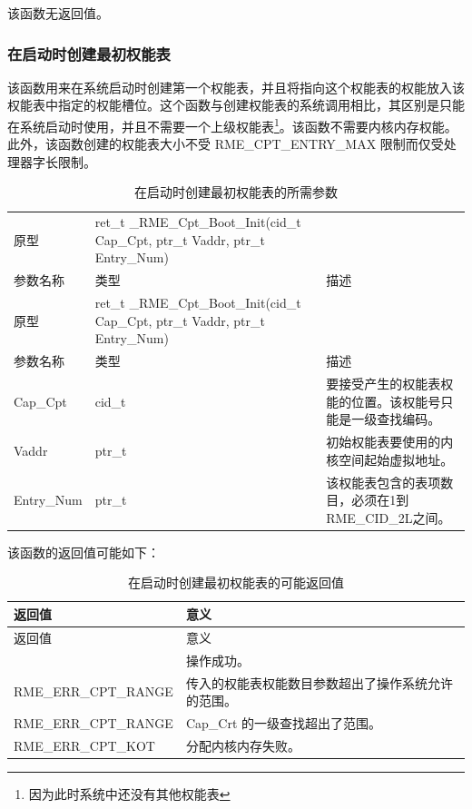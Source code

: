 该函数无返回值。

\subsubsection{在启动时创建最初权能表}\label{subsubsec:7-create-initial-capability-table-at-boot}

该函数用来在系统启动时创建第一个权能表，并且将指向这个权能表的权能放入该权能表中指定的权能槽位。这个函数与创建权能表的系统调用相比，其区别是只能在系统启动时使用，并且不需要一个上级权能表\footnote{因为此时系统中还没有其他权能表}。该函数不需要内核内存权能。此外，该函数创建的权能表大小不受 RME\_CPT\_ENTRY\_MAX 限制而仅受处理器字长限制。

\begin{xltabular}{\textwidth}{@{}>{\hsize\raggedright\arraybackslash}X>{\hsize\raggedright\arraybackslash}X>{\hsize\raggedright\arraybackslash}X@{}}
\caption{在启动时创建最初权能表的所需参数}\label{tab:7-41-create-initial-capability-table-at-boot-parameters}\\
\toprule
原型 & ret\_t \_RME\_Cpt\_Boot\_Init(cid\_t Cap\_Cpt, ptr\_t Vaddr,
ptr\_t Entry\_Num) &\tabularnewline
参数名称 & 类型 & 描述\tabularnewline
\endfirsthead
\toprule
原型 & ret\_t \_RME\_Cpt\_Boot\_Init(cid\_t Cap\_Cpt, ptr\_t Vaddr,
ptr\_t Entry\_Num) &\tabularnewline
参数名称 & 类型 & 描述\tabularnewline
\midrule
\endhead
\bottomrule
\endlastfoot
Cap\_Cpt & cid\_t &
要接受产生的权能表权能的位置。该权能号只能是一级查找编码。\tabularnewline
Vaddr & ptr\_t & 初始权能表要使用的内核空间起始虚拟地址。\tabularnewline
Entry\_Num & ptr\_t &
该权能表包含的表项数目，必须在1到RME\_CID\_2L之间。\tabularnewline
\end{xltabular}

该函数的返回值可能如下：

\begin{xltabular}{\textwidth}{@{}>{\hsize\raggedright\arraybackslash}X>{\hsize\raggedright\arraybackslash}X@{}}
\caption{在启动时创建最初权能表的可能返回值}\label{tab:7-42-create-initial-capability-table-at-boot-return-values}\\
\toprule
返回值 & 意义\tabularnewline
\endfirsthead
\toprule
返回值 & 意义\tabularnewline
\midrule
\endhead
\bottomrule
{} & 操作成功。\tabularnewline
    RME\_ERR\_CPT\_RANGE & 传入的权能表权能数目参数超出了操作系统允许的范围。\tabularnewline
    RME\_ERR\_CPT\_RANGE & Cap\_Crt 的一级查找超出了范围。\tabularnewline
    RME\_ERR\_CPT\_KOT & 分配内核内存失败。\tabularnewline
\end{xltabular}

